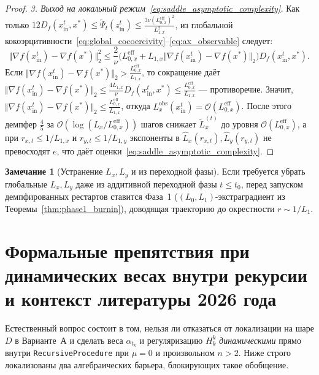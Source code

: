 \documentclass[11pt, a4paper]{article}
\theoremstyle{definition}
\newtheorem{remark}{Замечание}[section]
\begin{document}
\begin{proof}
\emph{3. Выход на локальный режим~\eqref{eq:saddle_asymptotic_complexity}.} Как только $12 D_f(x_{\mathrm{in}}^t, x^*) \le \widetilde{\Psi}_t(z_{\mathrm{in}}^t) \le \frac{3\nu (L_{0,x}^{\mathrm{eff}})^2}{L_{1,x}^2}$, из глобальной кокоэрцитивности~\eqref{eq:global_cocoercivity}--\eqref{eq:ax_observable} следует:
\[
\Vert \nabla f(x_{\mathrm{in}}^t) - \nabla f(x^*) \Vert_2^2 \le \frac{2}{\nu}\big(L_{0,x}^{\mathrm{eff}} + L_{1,x}\Vert \nabla f(x_{\mathrm{in}}^t) - \nabla f(x^*) \Vert_2\big) D_f(x_{\mathrm{in}}^t, x^*).
\]
Если $\Vert \nabla f(x_{\mathrm{in}}^t) - \nabla f(x^*) \Vert_2 > \frac{L_{0,x}^{\mathrm{eff}}}{L_{1,x}}$, то сокращение даёт $\Vert \nabla f(x_{\mathrm{in}}^t) - \nabla f(x^*) \Vert_2 \le \frac{4 L_{1,x}}{\nu} D_f(x_{\mathrm{in}}^t, x^*) \le \frac{L_{0,x}^{\mathrm{eff}}}{L_{1,x}}$ --- противоречие. Значит, $\Vert \nabla f(x_{\mathrm{in}}^t) - \nabla f(x^*) \Vert_2 \le \frac{L_{0,x}^{\mathrm{eff}}}{L_{1,x}}$, откуда $L_x^{\mathrm{obs}}(x_{\mathrm{in}}^t) = \mathcal{O}(L_{0,x}^{\mathrm{eff}})$. После этого демпфер $\frac{4}{5}$ за $\mathcal{O}(\log(L_x / L_{0,x}^{\mathrm{eff}}))$ шагов снижает $\widetilde{L}_x^{(t)}$ до уровня $\mathcal{O}(L_{0,x}^{\mathrm{eff}})$, а при $r_{x,t} \le 1/L_{1,x}$ и $r_{y,t} \le 1/L_{1,y}$ экспоненты в $\widehat{L}_x(r_{x,t}), \widehat{L}_y(r_{y,t})$ не превосходят $e$, что даёт оценки~\eqref{eq:saddle_asymptotic_complexity}.
\end{proof}

\begin{remark}[Устранение $L_x, L_y$ и из переходной фазы]
Если требуется убрать глобальные $L_x, L_y$ даже из аддитивной переходной фазы $t \le t_0$, перед запуском демпфированных рестартов ставится Фаза~1 ($(L_0, L_1)$-экстраградиент из Теоремы~\ref{thm:phase1_burnin}), доводящая траекторию до окрестности $r \sim 1/L_1$.
\end{remark}

\section{Формальные препятствия при динамических весах внутри рекурсии и контекст литературы 2026 года}

Естественный вопрос состоит в том, нельзя ли отказаться от локализации на шаре $D$ в Варианте~А и сделать веса $\alpha_{t_k}$ и регуляризацию $H_k^k$ \emph{динамическими} прямо внутри \texttt{RecursiveProcedure} при $\mu = 0$ и произвольном $n > 2$. Ниже строго локализованы два алгебраических барьера, блокирующих такое обобщение.
\end{document}
